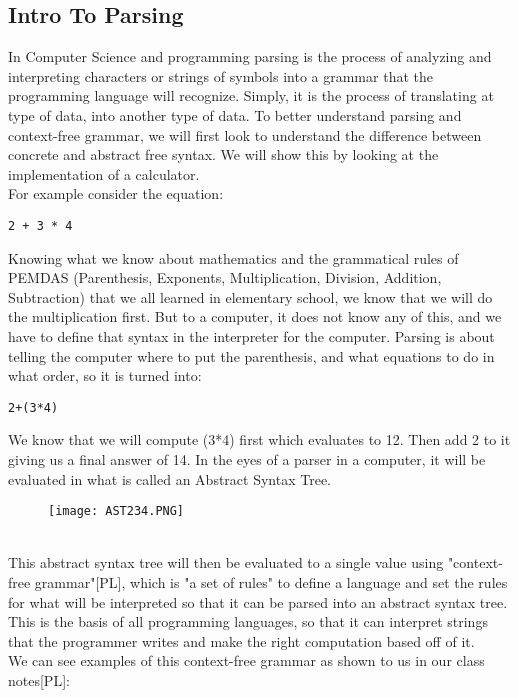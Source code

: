 \documentclass{article}
\begin{document}
\subsection{Intro To Parsing}
In Computer Science and programming parsing is the process of analyzing and interpreting characters or strings of symbols into a grammar that the programming language will recognize. Simply, it is the process of translating at type of data, into another type of data. To better understand parsing and context-free grammar, we will first look to understand the difference between concrete and abstract free syntax. We will show this by looking at the implementation of a calculator.
\\
For example consider the equation:
\begin{lstlisting}
2 + 3 * 4
\end{lstlisting}
Knowing what we know about mathematics and the grammatical rules of PEMDAS (Parenthesis, Exponents, Multiplication, Division, Addition, Subtraction) that we all learned in elementary school, we know that we will do the multiplication first. But to a computer, it does not know any of this, and we have to define that syntax in the interpreter for the computer. Parsing is about telling the computer where to put the parenthesis, and what equations to do in what order, so it is turned into:
\begin{lstlisting}
2+(3*4)
\end{lstlisting}
We know that we will compute (3*4) first which evaluates to 12. Then add 2 to it giving us a final answer of 14.
In the eyes of a parser in a computer, it will be evaluated in what is called an Abstract Syntax Tree.
\\
\begin{figure}[H]
    \centering

    \texttt{[image: AST234.PNG]}
\end{figure}
\\
This abstract syntax tree will then be evaluated to a single value using "context-free grammar"[PL], which is "a set of rules" to define a language and set the rules for what will be interpreted so that it can be parsed into an abstract syntax tree. This is the basis of all programming languages, so that it can interpret strings that the programmer writes and make the right computation based off of it.
\\
We can see examples of this context-free grammar as shown to us in our class notes[PL]:
\end{document}
